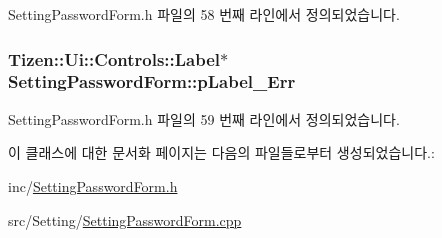 Setting\+Password\+Form.\+h 파일의 58 번째 라인에서 정의되었습니다.

\hypertarget{class_setting_password_form_a2cddadd3fdd619dc859566a6fde37c23}{
\subsubsection[{p\+Label\+\_\+\+Err}]{\setlength{\rightskip}{0pt plus 5cm}Tizen\+::\+Ui\+::\+Controls\+::\+Label$\ast$ Setting\+Password\+Form\+::p\+Label\+\_\+\+Err\hspace{0.3cm}{\ttfamily [protected]}}}\label{class_setting_password_form_a2cddadd3fdd619dc859566a6fde37c23}


Setting\+Password\+Form.\+h 파일의 59 번째 라인에서 정의되었습니다.



이 클래스에 대한 문서화 페이지는 다음의 파일들로부터 생성되었습니다.\+:\begin{DoxyCompactItemize}
\item 
inc/\hyperlink{_setting_password_form_8h}{Setting\+Password\+Form.\+h}\item 
src/\+Setting/\hyperlink{_setting_password_form_8cpp}{Setting\+Password\+Form.\+cpp}\end{DoxyCompactItemize}
